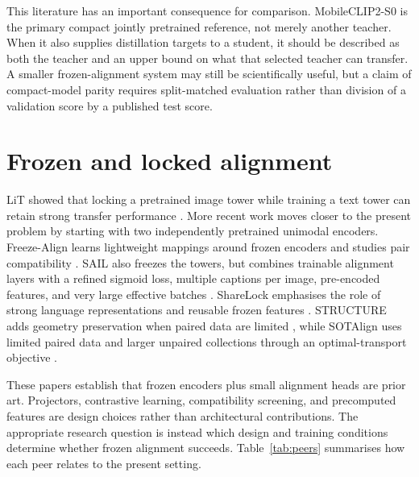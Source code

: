 This literature has an important consequence for comparison. MobileCLIP2-S0 is
the primary compact jointly pretrained reference, not merely another teacher.
When it also supplies distillation targets to a student, it should be described
as both the teacher and an upper bound on what that selected teacher can
transfer. A smaller frozen-alignment system may still be scientifically useful,
but a claim of compact-model parity requires split-matched evaluation rather
than division of a validation score by a published test score.

\section{Frozen and locked alignment}

LiT showed that locking a pretrained image tower while training a text tower can
retain strong transfer performance \cite{zhai2022lit}. More recent work moves
closer to the present problem by starting with two independently pretrained
unimodal encoders. Freeze-Align learns lightweight mappings around frozen
encoders and studies pair compatibility \cite{maniparambil2025freezealign}.
SAIL also freezes the towers, but combines trainable alignment layers with a
refined sigmoid loss, multiple captions per image, pre-encoded features, and
very large effective batches \cite{zhang2025sail}. ShareLock emphasises the role
of strong language representations and reusable frozen features
\cite{ruthardt2026sharelock}. STRUCTURE adds geometry preservation when paired
data are limited \cite{groger2025structure}, while SOTAlign uses limited paired
data and larger unpaired collections through an optimal-transport objective
\cite{roschmann2026sotalign}.

These papers establish that frozen encoders plus small alignment heads are
prior art. Projectors, contrastive learning, compatibility screening, and
precomputed features are design choices rather than architectural
contributions. The appropriate research question is instead which design and
training conditions determine whether frozen alignment succeeds.
Table~\ref{tab:peers} summarises how each peer relates to the present setting.

